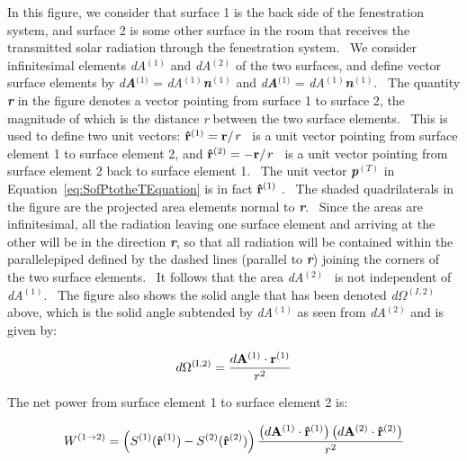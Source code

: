 In this figure, we consider that surface 1 is the back side of the fenestration system, and surface 2 is some other surface in the room that receives the transmitted solar radiation through the fenestration system.~ We consider infinitesimal elements \emph{dA}\(^{(1)}\) and \emph{dA}\(^{(2)}\) of the two surfaces, and define vector surface elements by \emph{d\textbf{A}}\textbf{\(^{(}\)}\(^{1)}\) = \emph{dA}\(^{(1)}\)\textbf{\emph{n}}\(^{(1)}\) and \emph{d\textbf{A}}\textbf{\(^{(}\)}\(^{1)}\) = \emph{dA}\(^{(1)}\)\textbf{\emph{n}}\(^{(1)}\).~ The quantity \textbf{\emph{r}} in the figure denotes a vector pointing from surface 1 to surface 2, the magnitude of which is the distance \emph{r} between the two surface elements.~ This is used to define two unit vectors: \({{\bf{\hat r}}^{{\rm{(1)}}}} = {{\bf{r}} \mathord{\left/ {\vphantom {{\bf{r}} r}} \right. } r}\) ~is a unit vector pointing from surface element 1 to surface element 2, and \({{\bf{\hat r}}^{{\rm{(2)}}}} = - {{\bf{r}} \mathord{\left/ {\vphantom {{\bf{r}} r}} \right. } r}\) ~is a unit vector pointing from surface element 2 back to surface element 1.~ The unit vector \textbf{\emph{p}}\(^{(T)}\) in Equation~\ref{eq:SofPtotheTEquation} is in fact \({{\bf{\hat r}}^{{\rm{(1)}}}}\) .~ The shaded quadrilaterals in the figure are the projected area elements normal to \textbf{\emph{r}}.~ Since the areas are infinitesimal, all the radiation leaving one surface element and arriving at the other will be in the direction \textbf{\emph{r}}, so that all radiation will be contained within the parallelepiped defined by the dashed lines (parallel to \textbf{\emph{r}}) joining the corners of the two surface elements.~ It follows that the area \emph{dA}\(^{(2)}\)~ is not independent of \emph{dA}\(^{(1)}\).~ The figure also shows the solid angle that has been denoted \emph{d}\(\Omega\)\(^{(I,2)}\) above, which is the solid angle subtended by \emph{dA}\(^{(1)}\) as seen from \emph{dA}\(^{(2)}\) and is given by:

\begin{equation}
d{\Omega ^{{\rm{(I,2)}}}} = \frac{{d{{\bf{A}}^{{\rm{(1)}}}} \cdot {{\bf{r}}^{{\rm{(1)}}}}}}{{{r^2}}}
\label{eq:dOmegaI2Equation}
\end{equation}

The net power from surface element 1 to surface element 2 is:

\begin{equation}
{W^{(1 \to 2)}} = \left( {{S^{{\rm{(1)}}}}({{{\bf{\hat r}}}^{{\rm{(1)}}}}) - {S^{{\rm{(2)}}}}({{{\bf{\hat r}}}^{{\rm{(2)}}}})} \right)\frac{{\left( {d{{\bf{A}}^{{\rm{(1)}}}} \cdot {{{\bf{\hat r}}}^{{\rm{(1)}}}}} \right)\left( {d{{\bf{A}}^{{\rm{(2)}}}} \cdot {{{\bf{\hat r}}}^{{\rm{(2)}}}}} \right)}}{{{r^2}}}
\end{equation}


